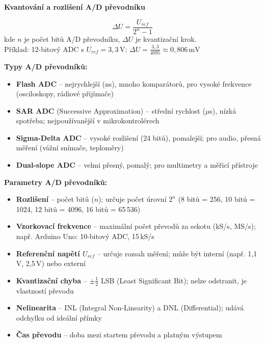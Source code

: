 \documentclass[a4paper,10pt]{article}
\begin{document}
\begin{vysvetlenibox}
\textbf{Kvantování a rozlišení A/D převodníku}

\begin{vzorcebox}
$$\Delta U = \frac{U_{ref}}{2^n - 1}$$
kde $n$ je počet bitů A/D převodníku, $\Delta U$ je kvantizační krok.\\
Příklad: 12-bitový ADC s $U_{ref} = 3{,}3\,\text{V}$:
$\Delta U = \frac{3{,}3}{4095} \approx 0{,}806\,\text{mV}$
\end{vzorcebox}

\textbf{Typy A/D převodníků:}
\begin{itemize}[noitemsep, leftmargin=1.4em, topsep=4pt]
    \item \textbf{Flash ADC} -- nejrychlejší (ns), mnoho komparátorů,
          pro vysoké frekvence (osciloskopy, rádiové přijímače)
    \item \textbf{SAR ADC} (Successive Approximation) -- střední rychlost ($\mu$s),
          nízká spotřeba; nejpoužívanější v mikrokontrolérech
    \item \textbf{Sigma-Delta ADC} -- vysoké rozlišení (24 bitů), pomalejší;
          pro audio, přesná měření (vážní snímače, teploměry)
    \item \textbf{Dual-slope ADC} -- velmi přesný, pomalý;
          pro multimetry a měřicí přístroje
\end{itemize}

\textbf{Parametry A/D převodníků:}
\begin{itemize}[noitemsep, leftmargin=1.4em, topsep=4pt]
    \item \textbf{Rozlišení} -- počet bitů ($n$); určuje počet úrovní $2^n$
          (8 bitů = 256, 10 bitů = 1024, 12 bitů = 4096, 16 bitů = 65\,536)
    \item \textbf{Vzorkovací frekvence} -- maximální počet převodů za sekotu
          (kS/s, MS/s); např. Arduino Uno: 10-bitový ADC, 15\,kS/s
    \item \textbf{Referenční napětí $U_{ref}$} -- určuje rozsah měření;
          může být interní (např. 1,1\,V, 2,5\,V) nebo externí
    \item \textbf{Kvantizační chyba} -- $\pm \frac{1}{2}$ LSB (Least Significant Bit);
          nelze odstranit, je vlastností převodu
    \item \textbf{Nelinearita} -- INL (Integral Non-Linearity) a DNL (Differential);
          udává odchylku od ideální přímky
    \item \textbf{Čas převodu} -- doba mezi startem převodu a platným výstupem
\end{itemize}


\end{vysvetlenibox}
\end{document}
